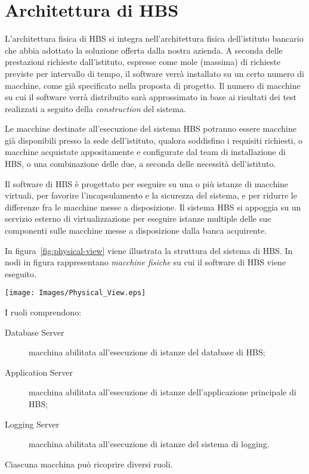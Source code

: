 
\section{Architettura di HBS}

L'architettura fisica di HBS si integra nell'architettura fisica dell'istituto bancario che abbia adottato la soluzione offerta dalla nostra azienda.
A seconda delle prestazioni richieste dall'istituto, espresse come mole (massima) di richieste previste per intervallo di tempo, il software verr\`a installato su un certo numero di macchine, come gi\`a specificato nella proposta di progetto.
Il numero di macchine su cui il software verr\`a distribuito sar\`a approssimato in base ai risultati dei test realizzati a seguito della \emph{construction} del sistema.

Le macchine destinate all'esecuzione del sistema HBS potranno essere macchine gi\`a disponibili presso la sede dell'istituto, qualora soddisfino i requisiti richiesti, o macchine acquistate appositamente e configurate dal team di installazione di HBS, o una combinazione delle due, a seconda delle necessit\`a dell'istituto.

Il software di HBS \`e progettato per eseguire su una o pi\`u istanze di macchine virtuali, per favorire l'incapsulamento e la sicurezza del sistema, e per ridurre le differenze fra le macchine messe a disposizione.
Il sistema HBS si appoggia su un servizio esterno di virtualizzazione per eseguire istanze multiple delle sue componenti sulle macchine messe a disposizione dalla banca acquirente.

In figura~\ref{fig:physical-view} viene illustrata la struttura del sistema di HBS.
In nodi in figura rappresentano \emph{macchine fisiche} su cui il software di HBS viene eseguito.

\begin{figure*}[h]
	\centering
	\texttt{[image: Images/Physical\_View.eps]}
	\caption{Diagramma di deployment del sistema.}
	\label{fig:physical-view}
\end{figure*}

I ruoli comprendono:
\begin{description}
	\item[Database Server] macchina abilitata all'esecuzione di istanze del database di HBS;

	\item[Application Server] macchina abilitata all'esecuzione di istanze dell'applicazione principale di HBS;

	\item[Logging Server] macchina abilitata all'esecuzione di istanze del sistema di logging.
\end{description}
Ciascuna macchina pu\`o ricoprire diversi ruoli.

